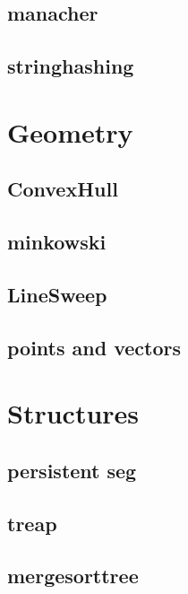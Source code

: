 \subsection{manacher}
\raggedbottom
\hrulefill
\subsection{stringhashing}
\raggedbottom
\hrulefill

\section{Geometry}
\subsection{ConvexHull}
\raggedbottom
\hrulefill
\subsection{minkowski}
\raggedbottom
\hrulefill
\subsection{LineSweep}
\raggedbottom
\hrulefill
\subsection{points and vectors}
\raggedbottom
\hrulefill

\section{Structures}
\subsection{persistent seg}
\raggedbottom
\hrulefill
\subsection{treap}
\raggedbottom
\hrulefill
\subsection{mergesorttree}
\raggedbottom
\hrulefill
